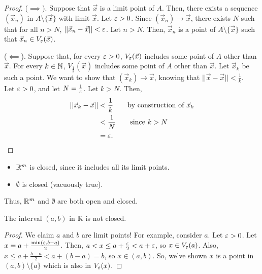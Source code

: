 \begin{proof}
($\implies$). Suppose that $\vec x$ is a limit point of $A$. Then, there exists a sequence $(\vec x_n)$ in $A\setminus \{\vec x\}$ with limit $\vec x$. Let $\varepsilon > 0$. Since $(\vec x_n) \to \vec x$, there exists $N$ such that for all $n > N$, $||\vec x_n - \vec x|| < \varepsilon$. Let $n > N$. Then, $\vec x_n$ is a point of $A \setminus\{\vec x\}$ such that $\vec x_n \in V_\varepsilon (\vec x)$.

($\impliedby$). Suppose that, for every $\varepsilon > 0$, $V_\varepsilon(\vec x)$ includes some point of $A$ other than $\vec x$. For every $k \in \mathbb{N}$, $V_{\frac 1 k} (\vec x)$ includes some point of $A$ other than $\vec x$. Let $\vec x_k$ be such a point. We want to show that $(\vec x_k) \to \vec x$, knowing that $||\vec x- \vec x|| < \frac 1 k$.\\

Let $\varepsilon > 0$, and let $N = \frac 1 {\varepsilon}$. Let $k > N$. Then,
\begin{align*}
    ||\vec x_k - \vec x || &< \frac 1 k \qquad \text{by construction of $\vec x_k$} \\
    &< \frac 1 N \qquad \text{since }k > N  \\
    &= \varepsilon.
\end{align*}
\end{proof}

\begin{example}
\begin{itemize}
    \item $\mathbb{R}^m$ is closed, since it includes all its limit points.
    \item $\emptyset$ is closed (vacuously true).
\end{itemize}

Thus, $\mathbb{R}^m$ and $\emptyset$ are both open and closed.
\end{example}

\begin{example}
The interval $(a,b)$ in $\mathbb{R}$ is not closed.
\end{example}

\begin{proof}
We claim $a$ and $b$ are limit points! For example, consider $a$. Let $\varepsilon > 0$. Let $x = a + \frac{\min(\varepsilon, b-a)}{2}$. Then, $a < x \le a + \frac {\varepsilon} 2 < a + \varepsilon$, so $x \in V_\varepsilon (a)$. Also, $x \le a + \frac {b-a}{2} < a + (b-a) = b$, so $x \in (a,b)$. So, we've shown $x$ is a point in $(a,b) \setminus \{a\}$ which is also in $V_\varepsilon (x)$.
\end{proof}